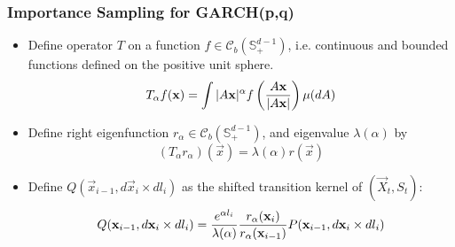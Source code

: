 \documentclass{beamer}
\begin{document}
\begin{frame}
  \frametitle{Importance Sampling for GARCH(p,q)}
  \begin{itemize}
  \item Define operator $T$ on a function $f \in \mathscr C_b(\mathbb
    S^{d-1}_+)$, i.e. continuous and bounded functions defined on the
    positive unit sphere.
    \[
    T_\alpha f(\vec x) = \int |A \vec x|^\alpha
    f\left({A \vec x \over |A \vec x|}\right) \mu(dA)
    \]
  \item Define right eigenfunction $r_\alpha \in \mathscr C_b(\mathbb
    S^{d-1}_+)$, and eigenvalue $\lambda(\alpha)$ by
    \[
    (T_\alpha r_\alpha)(\vec x) = \lambda(\alpha) r(\vec x)
    \]
  \item Define $Q(\vec x_{i-1}, d\vec x_{i} \times dl_{i})$ as the
    shifted transition kernel of $(\vec X_t, S_t)$:
    \[
    Q(\vec x_{i-1}, d\vec x_{i} \times dl_{i})
    =
    {e^{\alpha l_i} \over \lambda(\alpha) }
    {r_\alpha(\vec x_i) \over r_\alpha(\vec x_{i-1})}
    P(\vec x_{i-1}, d\vec x_{i} \times dl_{i})
    \]
  \end{itemize}
\end{frame}
\end{document}
